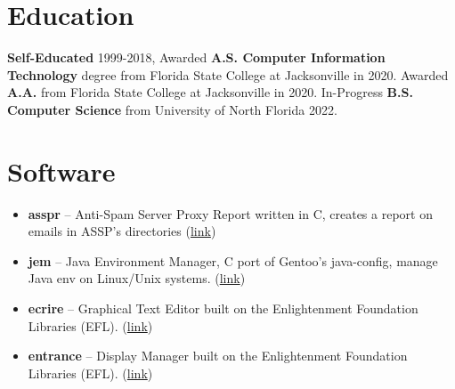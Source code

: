\documentclass[10pt]{report}
\begin{document}
\section*{Education}
\textbf{Self-Educated} 1999-2018, Awarded \textbf{A.S. Computer Information Technology} degree from Florida State College at Jacksonville in 2020. Awarded \textbf{A.A.} from Florida State College at Jacksonville in 2020. In-Progress \textbf{B.S. Computer Science} from University of North Florida 2022.

\section*{Software}
\begin{itemize}
  \item \textbf{asspr} – Anti-Spam Server Proxy Report written in C, creates a report on emails in ASSP's directories (\href{https://github.com/Obsidian-StudiosInc/asspr}{link})
  \item \textbf{jem} – Java Environment Manager, C port of Gentoo's java-config, manage Java env on Linux/Unix systems. (\href{https://github.com/Obsidian-StudiosInc/jem}{link})
  \item \textbf{ecrire} – Graphical Text Editor built on the Enlightenment Foundation Libraries (EFL). (\href{https://github.com/Obsidian-StudiosInc/ecrire}{link})
  \item \textbf{entrance} – Display Manager built on the Enlightenment Foundation Libraries (EFL). (\href{https://github.com/Obsidian-StudiosInc/entrance}{link})
\end{itemize}  
\end{document}
